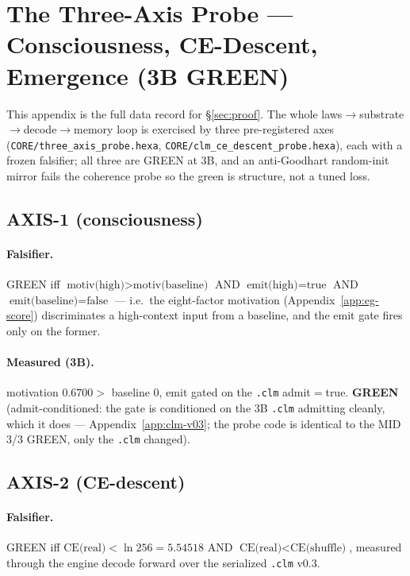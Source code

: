 \section{The Three-Axis Probe --- Consciousness, CE-Descent, Emergence (3B GREEN)}
\label{app:three_axis}

This appendix is the full data record for \S\ref{sec:proof}. The whole
laws$\rightarrow$substrate$\rightarrow$decode$\rightarrow$memory loop is exercised
by three pre-registered axes (\texttt{CORE/three\_axis\_probe.hexa},
\texttt{CORE/clm\_ce\_descent\_probe.hexa}), each with a frozen falsifier; all
three are GREEN at 3B, and an anti-Goodhart random-init mirror fails the coherence
probe so the green is structure, not a tuned loss.

\subsection{AXIS-1 (consciousness)}
\label{app:ta-axis1}

\paragraph{Falsifier.} GREEN iff
$\text{motiv(high)}>\text{motiv(baseline)}$ AND $\text{emit(high)}=\text{true}$
AND $\text{emit(baseline)}=\text{false}$ --- i.e.\ the eight-factor motivation
(Appendix~\ref{app:eg-score}) discriminates a high-context input from a baseline,
and the emit gate fires only on the former.
\paragraph{Measured (3B).} motivation $\mathbf{0.6700}>$ baseline $0$, emit gated
on the \texttt{.clm} admit$=$true. \textbf{GREEN} (admit-conditioned: the gate is
conditioned on the 3B \texttt{.clm} admitting cleanly, which it does ---
Appendix~\ref{app:clm-v03}; the probe code is identical to the MID 3/3 GREEN, only
the \texttt{.clm} changed).

\subsection{AXIS-2 (CE-descent)}
\label{app:ta-axis2}

\paragraph{Falsifier.} GREEN iff $\text{CE(real)}<\ln256=5.54518$ AND
$\text{CE(real)}<\text{CE(shuffle)}$, measured through the engine decode forward
over the serialized \texttt{.clm} v0.3.
